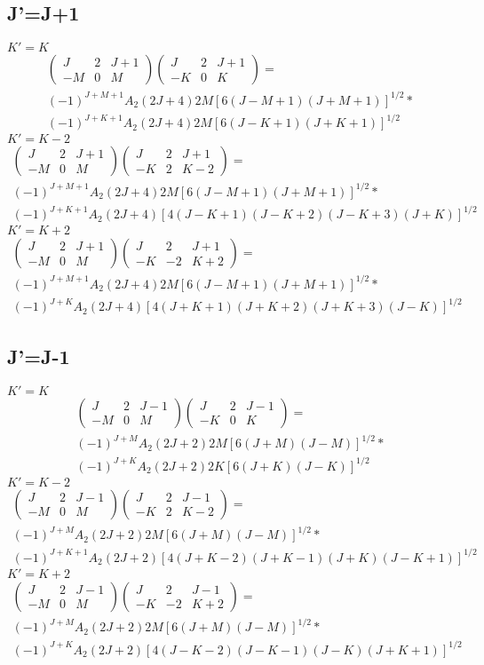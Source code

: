 \documentclass{article}
\newcommand{\wigner}[6]{\begin{pmatrix}{#1}&{#2}&{#3}\\{#4}&{#5}&{#6}\end{pmatrix}}
\begin{document}
\subsection{J'=J+1}
$K'=K$
\begin{align*}
\wigner{J}{2}{J+1}{-M}{0}{M}\wigner{J}{2}{J+1}{-K}{0}{K}=\\(-1)^{J+M+1}A_2(2J+4)2M[6(J-M+1)(J+M+1)]^{1/2}*\\(-1)^{J+K+1}A_2(2J+4)2M[6(J-K+1)(J+K+1)]^{1/2}
\end{align*}
$K'=K-2$
\begin{align*}
\wigner{J}{2}{J+1}{-M}{0}{M}\wigner{J}{2}{J+1}{-K}{2}{K-2}=\\(-1)^{J+M+1}A_2(2J+4)2M[6(J-M+1)(J+M+1)]^{1/2}*\\(-1)^{J+K+1}A_2(2J+4)[4(J-K+1)(J-K+2)(J-K+3)(J+K)]^{1/2}
\end{align*}
$K'=K+2$
\begin{align*}
\wigner{J}{2}{J+1}{-M}{0}{M}\wigner{J}{2}{J+1}{-K}{-2}{K+2}=\\(-1)^{J+M+1}A_2(2J+4)2M[6(J-M+1)(J+M+1)]^{1/2}*\\(-1)^{J+K}A_2(2J+4)[4(J+K+1)(J+K+2)(J+K+3)(J-K)]^{1/2}
\end{align*}
\subsection{J'=J-1}
$K'=K$
\begin{align*}
\wigner{J}{2}{J-1}{-M}{0}{M}\wigner{J}{2}{J-1}{-K}{0}{K}=\\(-1)^{J+M}A_2(2J+2)2M[6(J+M)(J-M)]^{1/2}*\\(-1)^{J+K}A_2(2J+2)2K[6(J+K)(J-K)]^{1/2}
\end{align*}
$K'=K-2$
\begin{align*}
\wigner{J}{2}{J-1}{-M}{0}{M}\wigner{J}{2}{J-1}{-K}{2}{K-2}=\\(-1)^{J+M}A_2(2J+2)2M[6(J+M)(J-M)]^{1/2}*\\(-1)^{J+K+1}A_2(2J+2)[4(J+K-2)(J+K-1)(J+K)(J-K+1)]^{1/2}
\end{align*}
$K'=K+2$
\begin{align*}
\wigner{J}{2}{J-1}{-M}{0}{M}\wigner{J}{2}{J-1}{-K}{-2}{K+2}=\\(-1)^{J+M}A_2(2J+2)2M[6(J+M)(J-M)]^{1/2}*\\(-1)^{J+K}A_2(2J+2)[4(J-K-2)(J-K-1)(J-K)(J+K+1)]^{1/2}
\end{align*}
\newpage
\end{document}
